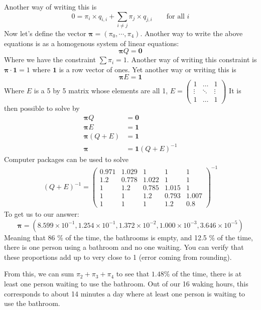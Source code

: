 Another way of writing this is
$$ 0 = \pi_i  \times q_{i, i} + \sum_{i \neq j} \pi_j \times q_{j, i} \qquad \text{for all  }i$$
Now let's define the vector $\boldsymbol{\pi}= (\pi_0, \cdots, \pi_4)$. Another way to write the above equations is as a homogenous system of linear equations:
$$ \boldsymbol{\pi}Q = \mathbf{0}$$
Where we have the constraint $ \sum\pi_i = 1 $. Another way of writing this constraint is $\boldsymbol{\pi} \cdot \mathbf{1} = 1$ where $\mathbf{1}$ is a row vector of ones. Yet another way or writing this is
$$\boldsymbol{\pi} E = \mathbf{1} $$
Where $E$ is a 5 by 5 matrix whose elements are all 1, 
$E = \begin{pmatrix}
1		&	\dots	& 1\\
\vdots	&	\ddots	& \vdots\\
1		&	\dots	& 1

\end{pmatrix}
$
It is then possible to solve by
\begin{align*}
	 \boldsymbol{\pi}Q &= \mathbf{0}\\
	 \boldsymbol{\pi} E &= \mathbf{1}\\
	 \boldsymbol{\pi} (Q + E) &= \mathbf{1}\\
	 \boldsymbol{\pi} & =  \mathbf{1}(Q+E)^{-1}
\end{align*}
Computer packages can be used to solve
\begin{align*}
	(Q+E)^{-1} = \begin{pmatrix}
	0.971	&	1.029	&	1 		& 1 		& 1	\\
	1.2  	&	0.778	& 1.022 	& 1 		& 1	\\
	1  		&	1.2		&0.785		&1.015 		& 1	\\
	1  		&	1		&	1.2 	&0.793		& 1.007\\
	1		&	1		&	1		& 1.2 		& 0.8
	\end{pmatrix}^{-1}
\end{align*}
To get us to our answer:
$$ \boldsymbol{\pi} = ( 8.599\times 10^{-1}, 1.254\times 10^{-1}, 1.372\times 10^{-2}, 1.000\times 10^{-3}, 3.646\times 10^{-5}) $$
Meaning that 86 \% of the time, the bathrooms is empty, and 12.5 \% of the time, there is one person using a bathroom and no one waiting. You can verify that these proportions add up to very close to 1 (error coming from rounding).

From this, we can sum $\pi_2 + \pi_3 + \pi_4$ to see that $1.48\%$ of the time, there is at least one person waiting to use the bathroom. Out of our 16 waking hours, this corresponds to about 14 minutes a day where at least one person is waiting to use the bathroom.

